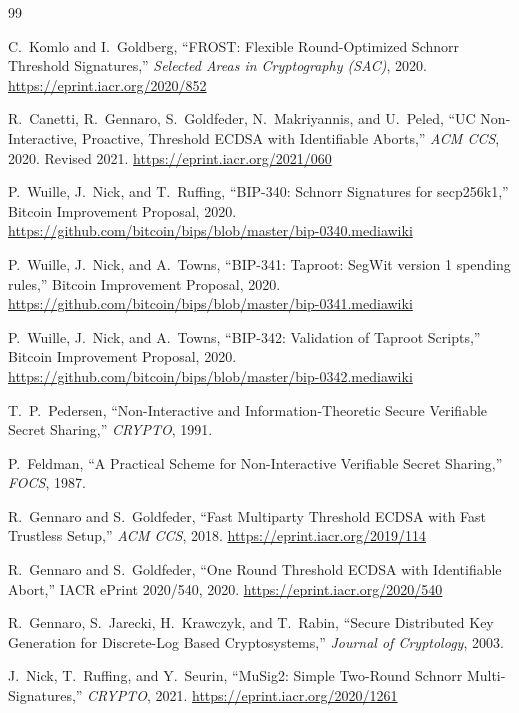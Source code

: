 \documentclass[11pt,twocolumn]{article}
\begin{document}

\begin{thebibliography}{99}

C.~Komlo and I.~Goldberg,
``FROST: Flexible Round-Optimized Schnorr Threshold Signatures,''
\textit{Selected Areas in Cryptography (SAC)}, 2020.
\url{https://eprint.iacr.org/2020/852}

R.~Canetti, R.~Gennaro, S.~Goldfeder, N.~Makriyannis, and U.~Peled,
``UC Non-Interactive, Proactive, Threshold ECDSA with Identifiable Aborts,''
\textit{ACM CCS}, 2020. Revised 2021.
\url{https://eprint.iacr.org/2021/060}

P.~Wuille, J.~Nick, and T.~Ruffing,
``BIP-340: Schnorr Signatures for secp256k1,''
Bitcoin Improvement Proposal, 2020.
\url{https://github.com/bitcoin/bips/blob/master/bip-0340.mediawiki}

P.~Wuille, J.~Nick, and A.~Towns,
``BIP-341: Taproot: SegWit version 1 spending rules,''
Bitcoin Improvement Proposal, 2020.
\url{https://github.com/bitcoin/bips/blob/master/bip-0341.mediawiki}

P.~Wuille, J.~Nick, and A.~Towns,
``BIP-342: Validation of Taproot Scripts,''
Bitcoin Improvement Proposal, 2020.
\url{https://github.com/bitcoin/bips/blob/master/bip-0342.mediawiki}

T.~P.~Pedersen,
``Non-Interactive and Information-Theoretic Secure Verifiable Secret Sharing,''
\textit{CRYPTO}, 1991.

P.~Feldman,
``A Practical Scheme for Non-Interactive Verifiable Secret Sharing,''
\textit{FOCS}, 1987.

R.~Gennaro and S.~Goldfeder,
``Fast Multiparty Threshold ECDSA with Fast Trustless Setup,''
\textit{ACM CCS}, 2018.
\url{https://eprint.iacr.org/2019/114}

R.~Gennaro and S.~Goldfeder,
``One Round Threshold ECDSA with Identifiable Abort,''
IACR ePrint 2020/540, 2020.
\url{https://eprint.iacr.org/2020/540}

R.~Gennaro, S.~Jarecki, H.~Krawczyk, and T.~Rabin,
``Secure Distributed Key Generation for Discrete-Log Based Cryptosystems,''
\textit{Journal of Cryptology}, 2003.

J.~Nick, T.~Ruffing, and Y.~Seurin,
``MuSig2: Simple Two-Round Schnorr Multi-Signatures,''
\textit{CRYPTO}, 2021.
\url{https://eprint.iacr.org/2020/1261}


\end{thebibliography}
\end{document}
